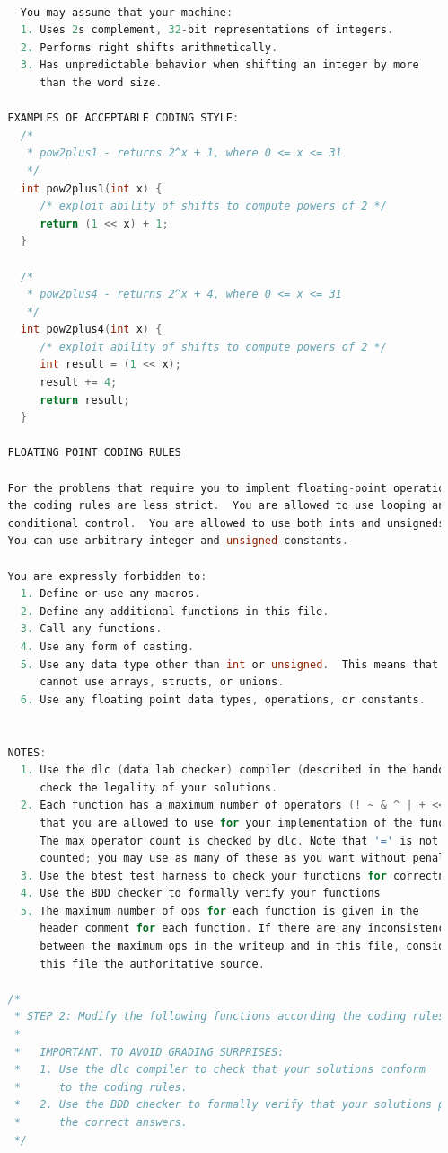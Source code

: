 \documentclass{article}
\begin{document}
\begin{lstlisting}[language=C]
    
     You may assume that your machine:
     1. Uses 2s complement, 32-bit representations of integers.
     2. Performs right shifts arithmetically.
     3. Has unpredictable behavior when shifting an integer by more
        than the word size.
   
   EXAMPLES OF ACCEPTABLE CODING STYLE:
     /*
      * pow2plus1 - returns 2^x + 1, where 0 <= x <= 31
      */
     int pow2plus1(int x) {
        /* exploit ability of shifts to compute powers of 2 */
        return (1 << x) + 1;
     }
   
     /*
      * pow2plus4 - returns 2^x + 4, where 0 <= x <= 31
      */
     int pow2plus4(int x) {
        /* exploit ability of shifts to compute powers of 2 */
        int result = (1 << x);
        result += 4;
        return result;
     }
   
   FLOATING POINT CODING RULES
   
   For the problems that require you to implent floating-point operations,
   the coding rules are less strict.  You are allowed to use looping and
   conditional control.  You are allowed to use both ints and unsigneds.
   You can use arbitrary integer and unsigned constants.
   
   You are expressly forbidden to:
     1. Define or use any macros.
     2. Define any additional functions in this file.
     3. Call any functions.
     4. Use any form of casting.
     5. Use any data type other than int or unsigned.  This means that you
        cannot use arrays, structs, or unions.
     6. Use any floating point data types, operations, or constants.
   
   
   NOTES:
     1. Use the dlc (data lab checker) compiler (described in the handout) to 
        check the legality of your solutions.
     2. Each function has a maximum number of operators (! ~ & ^ | + << >>)
        that you are allowed to use for your implementation of the function. 
        The max operator count is checked by dlc. Note that '=' is not 
        counted; you may use as many of these as you want without penalty.
     3. Use the btest test harness to check your functions for correctness.
     4. Use the BDD checker to formally verify your functions
     5. The maximum number of ops for each function is given in the
        header comment for each function. If there are any inconsistencies 
        between the maximum ops in the writeup and in this file, consider
        this file the authoritative source.
   
   /*
    * STEP 2: Modify the following functions according the coding rules.
    * 
    *   IMPORTANT. TO AVOID GRADING SURPRISES:
    *   1. Use the dlc compiler to check that your solutions conform
    *      to the coding rules.
    *   2. Use the BDD checker to formally verify that your solutions produce 
    *      the correct answers.
    */
   

\end{lstlisting}
\end{document}
